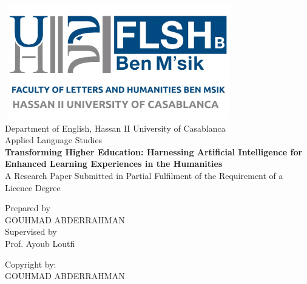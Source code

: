 \begin{titlepage}
  \centering
  \includegraphics[width=10cm, height=5cm]{./cover/univlogo.jpg} \\
  \centering
  Department of English, Hassan II University of Casablanca \\
  Applied Language Studies \\
  \vspace*{2cm}
  \textbf{\huge Transforming Higher Education: Harnessing Artificial Intelligence for Enhanced Learning Experiences in the Humanities} \\
  \vspace*{2cm}
  A Research Paper Submitted in Partial Fulfilment of the Requirement of a Licence Degree \\
  \vspace*{7cm}

  \begin{center}
    Prepared by\\ GOUHMAD
    ABDERRAHMAN\\ Supervised by \\
    Prof. Ayoub Loutfi \\
  \end{center}
  \newpage
  \thispagestyle{empty}
  \vspace*{20cm}
  Copyright by:\\
  GOUHMAD ABDERRAHMAN

  \vspace*{\fill}
  \mydate
\end{titlepage}